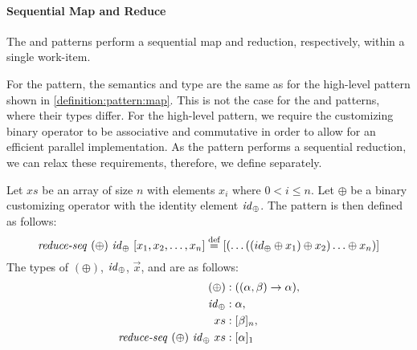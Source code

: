 \FloatBarrier

\paragraph{Sequential Map and Reduce}
The \mapSeq and \reduceSeq patterns perform a sequential map and reduction, respectively, within a single work-item.

For the \mapSeq pattern, the semantics and type are the same as for the high-level \map pattern shown in \autoref{definition:pattern:map}.
This is not the case for the \reduceSeq and \reduce patterns, where their types differ.
For the high-level \reduce pattern, we require the customizing binary operator to be associative and commutative in order to allow for an efficient parallel implementation.
As the \reduceSeq pattern performs a sequential reduction, we can relax these requirements, therefore, we define \reduceSeq separately.
\begin{definition}
  \label{definition:pattern:reduceSeq}
  Let $xs$ be an array of size $n$ with elements $x_i$ where $0 < i \leq n$.
  Let $\oplus$ be a binary customizing operator with the identity element $\text{\textit{id}}_\oplus$.
  The \reduceSeq pattern is then defined as follows:
  \begin{equation*}
    \reduceSeq\ (\oplus)\ \id_\oplus\ [x_1, x_2, \dots, x_n]
      \eqdef [(\dots((id_\oplus \oplus x_1) \oplus x_2) \ldots \oplus x_n)]
  \end{equation*}
  The types of $(\oplus)$, $\text{\textit{id}}_\oplus$, $\vec{x}$, and \reduce are as follows:
  \begin{align*}
    (\oplus) &: ((\alpha, \beta) \rightarrow \alpha),\\
    \text{\textit{id}}_\oplus &: \alpha,\\
    xs &: [\beta]_n,\\
    \text{\textit{reduce-seq}}\ (\oplus)\ \text{\textit{id}}_\oplus\ xs &: [\alpha]_1
  \end{align*}
\end{definition}


